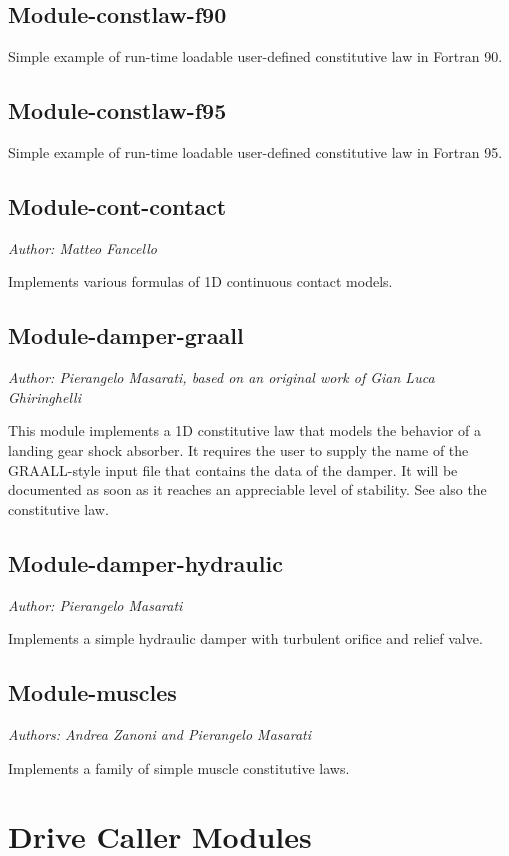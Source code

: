 \subsection{Module-constlaw-f90}
Simple example of run-time loadable user-defined constitutive law in Fortran 90.

\subsection{Module-constlaw-f95}
Simple example of run-time loadable user-defined constitutive law in Fortran 95.

\subsection{Module-cont-contact}
\emph{Author: Matteo Fancello}

\noindent
Implements various formulas of 1D continuous contact models.

\subsection{Module-damper-graall}
\emph{Author: Pierangelo Masarati, based on an original work of Gian Luca Ghiringhelli}

This module implements a 1D constitutive law that models
the behavior of a landing gear shock absorber.
It requires the user to supply the name of the GRAALL-style 
input file that contains the data of the damper.
It will be documented as soon as it reaches an appreciable level
of stability.
See also the 
constitutive law.

\subsection{Module-damper-hydraulic}
\emph{Author: Pierangelo Masarati}

\noindent
Implements a simple hydraulic damper with turbulent orifice and relief valve.

\subsection{Module-muscles}
\emph{Authors: Andrea Zanoni and Pierangelo Masarati}

\noindent
Implements a family of simple muscle constitutive laws.



\section{Drive Caller Modules}

